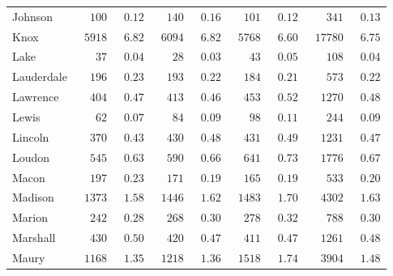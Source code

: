 \documentclass[9pt, oneside]{article}   	%
\begin{document}
\begin{longtable}{lcccccccc}
Johnson  & $\phantom{00}100$ & $\phantom{0}0.12$ & $\phantom{00}140$ & $\phantom{0}0.16$ & $\phantom{00}101$ & $\phantom{0}0.12$ & $\phantom{000}341$ & $\phantom{0}0.13$ \\
Knox  & $\phantom{0}5918$ & $\phantom{0}6.82$ & $\phantom{0}6094$ & $\phantom{0}6.82$ & $\phantom{0}5768$ & $\phantom{0}6.60$ & $\phantom{0}17780$ & $\phantom{0}6.75$ \\
Lake  & $\phantom{000}37$ & $\phantom{0}0.04$ & $\phantom{000}28$ & $\phantom{0}0.03$ & $\phantom{000}43$ & $\phantom{0}0.05$ & $\phantom{000}108$ & $\phantom{0}0.04$ \\
Lauderdale  & $\phantom{00}196$ & $\phantom{0}0.23$ & $\phantom{00}193$ & $\phantom{0}0.22$ & $\phantom{00}184$ & $\phantom{0}0.21$ & $\phantom{000}573$ & $\phantom{0}0.22$ \\
Lawrence  & $\phantom{00}404$ & $\phantom{0}0.47$ & $\phantom{00}413$ & $\phantom{0}0.46$ & $\phantom{00}453$ & $\phantom{0}0.52$ & $\phantom{00}1270$ & $\phantom{0}0.48$ \\
Lewis  & $\phantom{000}62$ & $\phantom{0}0.07$ & $\phantom{000}84$ & $\phantom{0}0.09$ & $\phantom{000}98$ & $\phantom{0}0.11$ & $\phantom{000}244$ & $\phantom{0}0.09$ \\
Lincoln  & $\phantom{00}370$ & $\phantom{0}0.43$ & $\phantom{00}430$ & $\phantom{0}0.48$ & $\phantom{00}431$ & $\phantom{0}0.49$ & $\phantom{00}1231$ & $\phantom{0}0.47$ \\
Loudon  & $\phantom{00}545$ & $\phantom{0}0.63$ & $\phantom{00}590$ & $\phantom{0}0.66$ & $\phantom{00}641$ & $\phantom{0}0.73$ & $\phantom{00}1776$ & $\phantom{0}0.67$ \\
Macon  & $\phantom{00}197$ & $\phantom{0}0.23$ & $\phantom{00}171$ & $\phantom{0}0.19$ & $\phantom{00}165$ & $\phantom{0}0.19$ & $\phantom{000}533$ & $\phantom{0}0.20$ \\
Madison  & $\phantom{0}1373$ & $\phantom{0}1.58$ & $\phantom{0}1446$ & $\phantom{0}1.62$ & $\phantom{0}1483$ & $\phantom{0}1.70$ & $\phantom{00}4302$ & $\phantom{0}1.63$ \\
Marion  & $\phantom{00}242$ & $\phantom{0}0.28$ & $\phantom{00}268$ & $\phantom{0}0.30$ & $\phantom{00}278$ & $\phantom{0}0.32$ & $\phantom{000}788$ & $\phantom{0}0.30$ \\
Marshall  & $\phantom{00}430$ & $\phantom{0}0.50$ & $\phantom{00}420$ & $\phantom{0}0.47$ & $\phantom{00}411$ & $\phantom{0}0.47$ & $\phantom{00}1261$ & $\phantom{0}0.48$ \\
Maury  & $\phantom{0}1168$ & $\phantom{0}1.35$ & $\phantom{0}1218$ & $\phantom{0}1.36$ & $\phantom{0}1518$ & $\phantom{0}1.74$ & $\phantom{00}3904$ & $\phantom{0}1.48$ \\

\end{longtable}
\end{document}
